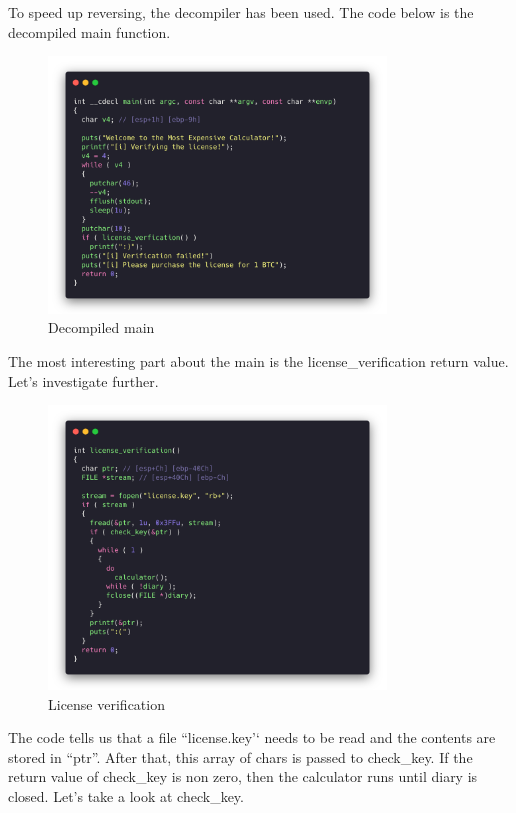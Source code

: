 To speed up reversing, the decompiler has been used. The code below is the
decompiled main function.
\begin{figure}[H]
  \centering
  \includegraphics[width=0.8\textwidth]{figures/main-decompiled}
  \caption{Decompiled main}
  \label{f:main-decompiled}
\end{figure}

The most interesting part about the main is the license\_verification return
value. Let's investigate further.

\begin{figure}[H]
  \centering
  \includegraphics[width=0.8\textwidth]{figures/license-verification}
  \caption{License verification}
  \label{f:license-verification}
\end{figure}

The code tells us that a file ``license.key'` needs to be read and the contents
are stored in ``ptr''. After that, this array of chars is passed to
check\_key. If the return value of check\_key is non zero, then the calculator
runs until diary is closed. Let's take a look at check\_key.

